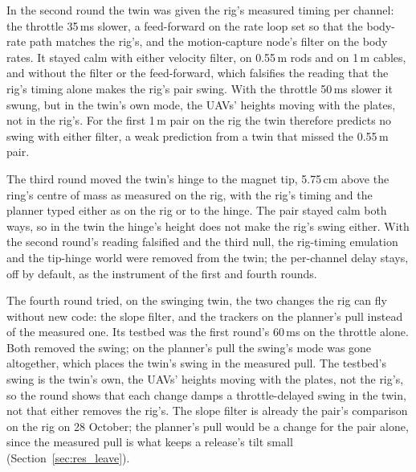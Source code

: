 In the second round the twin was given the rig's measured timing per channel: the throttle 35\,ms slower, a
feed-forward on the rate loop set so that the body-rate path matches the rig's, and the motion-capture node's filter
on the body rates. It stayed calm with either velocity filter, on 0.55\,m rods and on 1\,m cables, and without the
filter or the feed-forward, which falsifies the reading that the rig's timing alone makes the rig's pair swing. With
the throttle 50\,ms slower it swung, but in the twin's own mode, the UAVs' heights moving with the plates, not in the
rig's. For the first 1\,m pair on the rig the twin therefore predicts no swing with either filter, a weak prediction
from a twin that missed the 0.55\,m pair.

The third round moved the twin's hinge to the magnet tip, 5.75\,cm above the ring's centre of mass as measured on the
rig, with the rig's timing and the planner typed either as on the rig or to the hinge. The pair stayed calm both ways,
so in the twin the hinge's height does not make the rig's swing either. With the second round's reading falsified and
the third null, the rig-timing emulation and the tip-hinge world were removed from the twin; the per-channel delay
stays, off by default, as the instrument of the first and fourth rounds.

The fourth round tried, on the swinging twin, the two changes the rig can fly without new code: the slope filter, and
the trackers on the planner's pull instead of the measured one. Its testbed was the first round's 60\,ms on the
throttle alone. Both removed the swing; on the planner's pull the swing's mode was gone altogether, which places the
twin's swing in the measured pull. The testbed's swing is the twin's own, the UAVs' heights moving with the plates,
not the rig's, so the round shows that each change damps a throttle-delayed swing in the twin, not that either removes
the rig's. The slope filter is already the pair's comparison on the rig on 28 October; the planner's pull would be a
change for the pair alone, since the measured pull is what keeps a release's tilt small (Section~\ref{sec:res_leave}).

